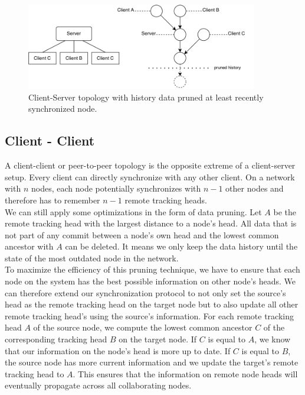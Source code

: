 \begin{figure}[hierarchy]
  \centering
  \includegraphics[width=0.9\textwidth]{img/client-server}
  \caption{Client-Server topology with history data pruned at least recently synchronized node.}
  \label{fig:histo.topologies.client-server}
\end{figure}

\subsection{Client - Client}
\label{sec:histo.topologies.p2p}
A client-client or peer-to-peer topology is the opposite extreme of a client-server setup.
Every client can directly synchronize with any other client.
On a network with $ n $ nodes, each node potentially synchronizes with $ n - 1 $ other nodes and therefore has to remember $ n - 1 $ remote tracking heads.\\
We can still apply some optimizations in the form of data pruning.
Let $ A $ be the remote tracking head with the largest distance to a node's head.
All data that is not part of any commit between a node's own head and the lowest common ancestor with $ A $ can be deleted.
It means we only keep the data history until the state of the most outdated node in the network.\\
To maximize the efficiency of this pruning technique, we have to ensure that each node on the system has the best possible information on other node's heads.
We can therefore extend our synchronization protocol to not only set the source's head as the remote tracking head on the target node but to also update all other remote tracking head's using the source's information.
For each remote tracking head $ A $ of the source node, we compute the lowest common ancestor $ C $ of the corresponding tracking head $ B $ on the target node.
If $ C $ is equal to $ A $, we know that our information on the node's head is more up to date.
If $ C $ is equal to $ B $, the source node has more current information and we update the target's remote tracking head to $ A $.
This ensures that the information on remote node heads will eventually propagate across all collaborating nodes.\\
